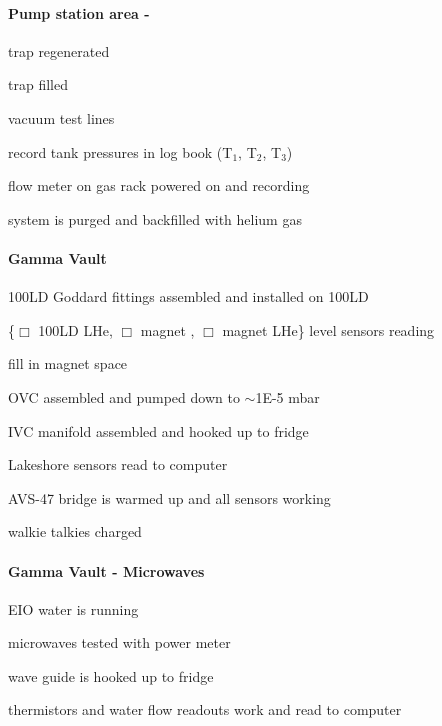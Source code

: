 \begin{appendices}
\paragraph{Pump station area - \het}
\begin{checklist}
 \item \lnn{} trap regenerated
 \item \lnn{} trap filled
 \item vacuum test \het{} lines
 \item record \het{} tank pressures in log book (T$_1$, T$_2$, T$_3$)
 \item flow meter on \het{} gas rack powered on and recording
 \item system is purged and backfilled with helium gas 
\end{checklist}

\paragraph{Gamma Vault}
\begin{checklist}
 \item 100LD Goddard fittings assembled and installed on 100LD
 \item \{$\Box$ 100LD LHe, $\Box$ magnet \lnn, $\Box$ magnet LHe\} level sensors reading
 \item fill \lnn{} in magnet space
 \item OVC assembled and pumped down to $\sim$1E-5 mbar %
 \item IVC manifold assembled and hooked up to fridge
 \item Lakeshore sensors read to computer
 \item AVS-47 bridge is warmed up and all sensors working
 \item walkie talkies charged
\end{checklist}

\paragraph{Gamma Vault - Microwaves}
\begin{checklist}
 \item EIO water is running
 \item microwaves tested with power meter
 \item wave guide is hooked up to fridge
 \item thermistors and water flow readouts work and read to computer
\end{checklist}


\end{appendices}
